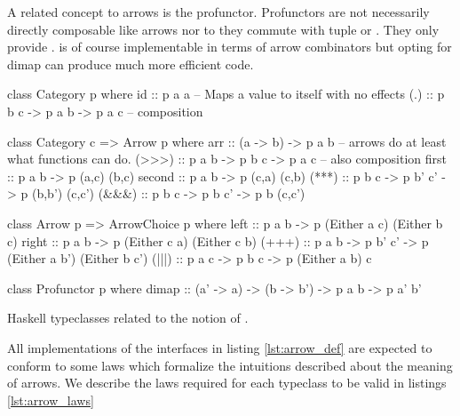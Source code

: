 A related concept to arrows is the profunctor. Profunctors are not
necessarily directly composable like arrows nor to they commute with
tuple or . They only provide . 
is of course implementable in terms of arrow combinators but opting
for dimap can produce much more efficient code.


\begin{code}
\begin{haskellcode}
class Category p where
  id :: p a a -- Maps a value to itself with no effects
  (.) :: p b c -> p a b -> p a c -- composition

class Category c => Arrow p where
  arr :: (a -> b) -> p a b -- arrows do at least what functions can do.
  (>>>) :: p a b -> p b c -> p a c -- also composition
  first :: p a b -> p (a,c) (b,c)
  second :: p a b -> p (c,a) (c,b)
  (***) :: p b c -> p b' c' -> p (b,b') (c,c')
  (&&&) :: p b c -> p b c' -> p b (c,c')

class Arrow p => ArrowChoice p where
  left :: p a b -> p (Either a c) (Either b c)
  right :: p a b -> p (Either c a) (Either c b)
  (+++) :: p a b -> p b' c' -> p (Either a b') (Either b c')
  (|||) :: p a c -> p b c -> p (Either a b) c

class Profunctor p where
  dimap :: (a' -> a) -> (b -> b') -> p a b -> p a' b'
\end{haskellcode}
\label{lst:arrow_def}
\caption{Haskell typeclasses related to the notion of .}
\end{code}


All implementations of the interfaces in listing \ref{lst:arrow_def}
are expected to conform to some laws which formalize the intuitions
described about the meaning of arrows. We describe the laws required
for each typeclass to be valid in listings \ref{lst:arrow_laws}

